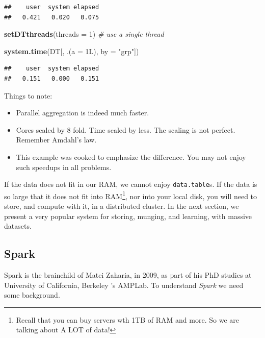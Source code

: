 \documentclass[]{book}
\newenvironment{Shaded}{\begin{snugshade}}{\end{snugshade}}
\newcommand{\CommentTok}[1]{\textcolor[rgb]{0.56,0.35,0.01}{\textit{#1}}}
\newcommand{\DataTypeTok}[1]{\textcolor[rgb]{0.13,0.29,0.53}{#1}}
\newcommand{\DecValTok}[1]{\textcolor[rgb]{0.00,0.00,0.81}{#1}}
\newcommand{\KeywordTok}[1]{\textcolor[rgb]{0.13,0.29,0.53}{\textbf{#1}}}
\newcommand{\NormalTok}[1]{#1}
\newcommand{\StringTok}[1]{\textcolor[rgb]{0.31,0.60,0.02}{#1}}
\providecommand{\tightlist}{%
  \setlength{\itemsep}{0pt}\setlength{\parskip}{0pt}}
\theoremstyle{definition}
\theoremstyle{definition}
\theoremstyle{definition}
\theoremstyle{remark}
\begin{document}
\begin{verbatim}
##    user  system elapsed 
##   0.421   0.020   0.075
\end{verbatim}

\begin{Shaded}
\begin{Highlighting}[]
\KeywordTok{setDTthreads}\NormalTok{(}\DataTypeTok{threads =} \DecValTok{1}\NormalTok{) }\CommentTok{# use a single thread}

\KeywordTok{system.time}\NormalTok{(DT[, .(}\DataTypeTok{a =}\NormalTok{ 1L), }\DataTypeTok{by =} \StringTok{"grp"}\NormalTok{])}
\end{Highlighting}
\end{Shaded}

\begin{verbatim}
##    user  system elapsed 
##   0.151   0.000   0.151
\end{verbatim}

Things to note:

\begin{itemize}
\tightlist
\item
  Parallel aggregation is indeed much faster.
\item
  Cores scaled by 8 fold. Time scaled by less. The scaling is not perfect. Remember Amdahl's law.
\item
  This example was cooked to emphasize the difference. You may not enjoy such speedups in all problems.
\end{itemize}

If the data does not fit in our RAM, we cannot enjoy \texttt{data.table}s.
If the data is so large that it does not fit into RAM\footnote{Recall that you can buy servers wth 1TB of RAM and more. So we are talking about A LOT of data!}, nor into your local disk, you will need to store, and compute with it, in a distributed cluster.
In the next section, we present a very popular system for storing, munging, and learning, with massive datasets.

\hypertarget{spark}{%
\subsection{Spark}\label{spark}}

Spark is the brainchild of Matei Zaharia, in 2009, as part of his PhD studies at University of California, Berkeley 's AMPLab.
To understand \emph{Spark} we need some background.
\end{document}
